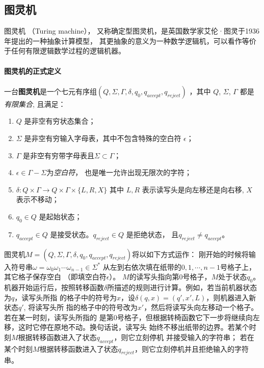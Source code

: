 \subsection{图灵机}
\def\TuringMathDef{(Q, \Sigma, \Gamma, \delta, q_0, q_{accept}, q_{reject})}

图灵机 \cite{doi:10.1112/plms/s2-42.1.230} （Turing machine），
又称确定型图灵机，是英国数学家艾伦·图灵于1936年提出的一种抽象计算模型，
其更抽象的意义为一种数学逻辑机，可以看作等价于任何有限逻辑数学过程的逻辑机器。

\paragraph{图灵机的正式定义}
一台\textbf{图灵机}是一个七元有序组$\TuringMathDef$ ，其中 $Q$, $\Sigma$, $\Gamma$ 都是\emph{有限集合}, 且满足：
\begin{enumerate}
  \item $Q$ 是非空有穷状态集合；
  \item $\Sigma$ 是非空有穷输入字母表，其中不包含特殊的空白符 $\epsilon$；
  \item $\Gamma$ 是非空有穷带字母表且$\Sigma \subset \Gamma$；
  \item $\epsilon \in \Gamma - \Sigma $为\emph{空白符}，
    也是唯一允许出现无限次的字符；
  \item $ \delta: Q \times \Gamma \rightarrow Q \times \Gamma \times \{L,R,X\} $
    其中 $L, R$ 表示读写头是向左移还是向右移, $X$ 表示不移动；
  \item $q_0 \in Q$ 是起始状态；
  \item $q_{accept} \in Q$ 是接受状态。$q_{reject} \in Q$ 是拒绝状态，
    且$q_{reject} \neq q_{accept}$。
\end{enumerate}

图灵机$ M = \TuringMathDef $将以如下方式运作：
刚开始的时候将输入符号串$\omega = \omega_0\omega_1\cdots\omega_{n-1} \in \Sigma^{*}$
从左到右依次填在纸带的$0,1,\cdots,n-1$号格子上，其它格子保存空白 （即填空白符$\epsilon$）。
$M$的读写头指向第0号格子，$M$处于状态$q_0$。
机器开始运行后，按照转移函数$\delta$所描述的规则进行计算。例如，若当前机器状态为$q$，读写头所指
的格子中的符号为$x$，设$\delta(q,x) = (q',x',L)$，则机器进入新状态$q'$, 将读写头所
指的格子中的符号改为$x'$，然后将读写头向左移动一个格子。若在某一时刻，读写头所指的
是第0号格子，但根据转椅函数它下一步将继续向左移，这时它停在原地不动。换句话说，读写头
始终不移出纸带的边界。若某个时刻$M$根据转移函数进入了状态$q_{accept}$，则它立刻停机 并接受输入的字符串；
若在某个时刻$M$根据转移函数进入了状态$q_{reject}$，则它立刻停机并且拒绝输入的字符串。

